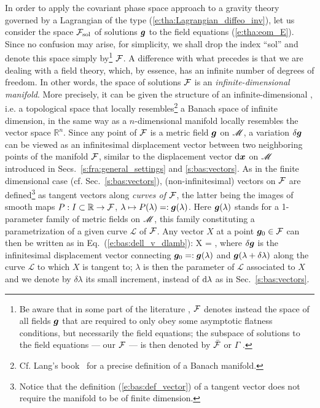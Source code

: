 In order to apply the covariant phase space approach to
a gravity theory governed by a Lagrangian of the type (\ref{e:tha:Lagrangian_diffeo_inv}),
let us consider the
space $\mathcal{F}_{\rm sol}$ of solutions $\bm{g}$ to the field equations
(\ref{e:tha:eom_E}). Since no confusion may arise, for simplicity,
we shall drop the index ``sol'' and denote this space simply by\footnote{Be aware that in
some part of the
literature \cite{AshteBR91,LeeW90,WaldZ00}, $\mathcal{F}$ denotes instead the space of all fields $\bm{g}$
that are required to only obey some asymptotic flatness conditions, but necessarily the field equations;
the subspace of solutions to the field equations --- our $\mathcal{F}$ --- is then denoted
by $\bar{\mathcal{F}}$ \cite{LeeW90,WaldZ00} or $\Gamma$ \cite{AshteBR91}.} $\mathcal{F}$.
A difference with what precedes is that
we are dealing with a field theory, which, by essence, has
an infinite number of degrees of freedom. In other words,
the space of solutions $\mathcal{F}$ is
an \emph{infinite-dimensional manifold}. More precisely, it can be given the structure of an
infinite-dimensional 
\cite{LeeW90,HarloW20}, i.e. a topological space that locally resembles\footnote{Cf. Lang's book~\cite{Lang95} for a
precise definition of a Banach manifold.} a Banach space of infinite dimension, in the same
way as a $n$-dimensional manifold locally resembles the vector space $\mathbb{R}^n$.
Since any point of $\mathcal{F}$ is a metric field $\bm{g}$ on $\mathscr{M}$, a variation $\delta\bm{g}$
can be viewed as an infinitesimal displacement vector between two neighboring points of the manifold
$\mathcal{F}$, similar to the displacement vector $\mathrm{d}\bm{x}$ on $\mathscr{M}$ introduced in Secs.~\ref{s:fra:general_settings} and \ref{s:bas:vectors}.
As in the finite dimensional case
(cf. Sec.~\ref{s:bas:vectors}), (non-infinitesimal) vectors on $\mathcal{F}$
are defined\footnote{Notice that the definition (\ref{e:bas:def_vector}) of a tangent vector
does not require the manifold to be of finite dimension.} as tangent vectors
along \emph{curves of} $\mathcal{F}$, the latter being the images of smooth maps
$P: I\subset \mathbb{R} \to  \mathcal{F}$, $\lambda\mapsto P(\lambda) =: \bm{g}(\lambda)$. Here
$\bm{g}(\lambda)$ stands for a 1-parameter family of metric fields
on $\mathscr{M}$, this family constituting a parametrization of a given curve $\mathcal{L}$ of $\mathcal{F}$.
Any vector $X$ at a point $\bm{g}_0 \in \mathcal{F}$ can then be written as in Eq.~(\ref{e:bas:dell_v_dlamb}):
\be \label{e:tha:X_dg/dlambda}
    X =  ,
\ee
where $\delta\bm{g}$ is the infinitesimal displacement vector connecting $\bm{g}_0 =: \bm{g}(\lambda)$
and $\bm{g}(\lambda+\delta\lambda)$ along the curve $\mathcal{L}$
to which $X$ is tangent to; $\lambda$ is then the parameter of $\mathcal{L}$ associated to $X$
and we denote by $\delta\lambda$ its small increment, instead of $\mathrm{d}\lambda$ as in Sec.~\ref{s:bas:vectors}.


